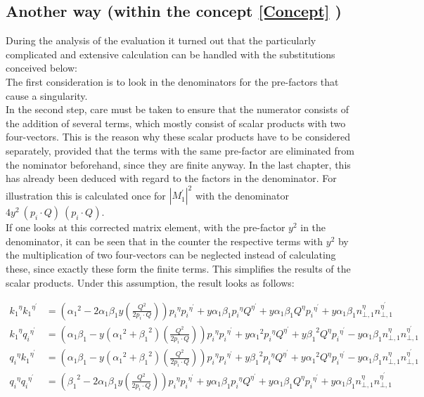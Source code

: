 \subsection{Another way (within the concept \ref{Concept} )}
During the analysis of the evaluation it turned out that the particularly complicated and extensive calculation can be handled with the substitutions conceived below:\\
The first consideration is to look in the denominators for the pre-factors that cause a singularity. \\
In the second step, care must be taken to ensure that the numerator consists of the addition of several terms, which mostly consist of scalar products with two four-vectors. This is the reason why these scalar products have to be considered separately, provided that the terms with the same pre-factor are eliminated from the nominator beforehand, since they are finite anyway.
In the last chapter, this has already been deduced with regard to the factors in the denominator. 
For illustration this is calculated once for ${|{M}^{\prime}_1|}^2$ with the denominator $ 4y^2\:(p_i\cdot Q) \:(p_i\cdot Q) $. \\
If one looks at this corrected matrix element, with the pre-factor $ y^2 $ in the denominator, it can be seen that in the counter the respective terms with $ y^2 $ by the multiplication of two four-vectors can be neglected instead of calculating these, since exactly these form the finite terms. This simplifies the results of the scalar products. Under this assumption, the result looks as follows:

\begin{equation}
\begin{split}
{k_1}^{{\eta}}{k_1}^{{\eta}^{\prime}}&=({\alpha_1}^2 -2\alpha_1 \beta_1 y(\frac{Q^2}{2 p_i \cdot Q})){p_i}^{{\eta}}{p_i}^{{\eta}^{\prime}}+y\alpha_1 \beta_1 {p_i}^{{\eta}}{Q}^{{\eta}^{\prime}}+y\alpha_1 \beta_1 {Q}^{{\eta}}{p_i}^{{\eta}^{\prime}}+y\alpha_1\beta_1 {n}^{{\eta}}_{\bot,1}{n}^{{\eta}^{\prime}}_{\bot,1}\\
{k_1}^{{\eta}}{q_i}^{{\eta}^{\prime}}&=({\alpha_1}\beta_1 -y({\alpha_1}^2 + {\beta_1}^2 )(\frac{Q^2}{2 p_i \cdot Q})){p_i}^{{\eta}}{p_i}^{{\eta}^{\prime}}+y{\alpha_1}^2 {p_i}^{{\eta}}{Q}^{{\eta}^{\prime}}+y{\beta_1}^2 {Q}^{{\eta}}{p_i}^{{\eta}^{\prime}}-y\alpha_1\beta_1 {n}^{{\eta}}_{\bot,1}{n}^{{\eta}^{\prime}}_{\bot,1}\\
{q_i}^{{\eta}}{k_1}^{{\eta}^{\prime}}&=({\alpha_1}\beta_1 -y({\alpha_1}^2 + {\beta_1}^2 )(\frac{Q^2}{2 p_i \cdot Q})){p_i}^{{\eta}}{p_i}^{{\eta}^{\prime}}+y{\beta_1}^2 {p_i}^{{\eta}}{Q}^{{\eta}^{\prime}}+y{\alpha_1}^2 {Q}^{{\eta}}{p_i}^{{\eta}^{\prime}}-y\alpha_1\beta_1 {n}^{{\eta}}_{\bot,1}{n}^{{\eta}^{\prime}}_{\bot,1}\\
{q_i}^{{\eta}}{q_i}^{{\eta}^{\prime}}&=({\beta_1}^2 -2\alpha_1 \beta_1 y(\frac{Q^2}{2 p_i \cdot Q})){p_i}^{{\eta}}{p_i}^{{\eta}^{\prime}}+y\alpha_1 \beta_1 {p_i}^{{\eta}}{Q}^{{\eta}^{\prime}}+y\alpha_1 \beta_1 {Q}^{{\eta}}{p_i}^{{\eta}^{\prime}}+y\alpha_1\beta_1 {n}^{{\eta}}_{\bot,1}{n}^{{\eta}^{\prime}}_{\bot,1}
\end{split}
\end{equation}

